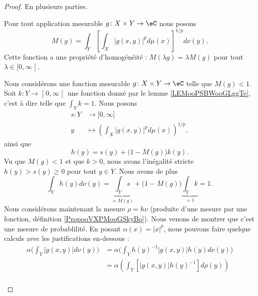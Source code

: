 \begin{proof}
	En plusieurs parties.
	\begin{subproof}
		\item[La fonction $M$]
		Pour tout application mesurable \( g\colon X\times Y\to \eC\) nous posons
		\begin{equation}
			M(g)=\int_Y \left[ \int_X| g(x,y) |^pd\mu(x) \right]^{1/p}d\nu(y).
		\end{equation}
		Cette fonction a une propriété d'homogénéité : \( M(\lambda g)=\lambda M(g)\) pour tout \( \lambda\in \mathopen[ 0 , \infty \mathclose[\).
			\item[Si $ M(g)<1 $]
			Nous considérons une fonction mesurable \( g\colon X\times Y\to \eC\) telle que \( M(g)<1\). Soit \( k\colon Y\to \mathopen] 0 , \infty \mathclose[\) une fonction donné par le lemme \ref{LEMooPSBWooGLggTe}, c'est à dire telle que \( \int_Yk=1\). Nous posons
		\begin{equation}
			\begin{aligned}
				s\colon Y & \to \mathopen[ 0 , \infty \mathclose]                   \\
				y         & \mapsto \left( \int_X| g(x,y) |^pd\mu(x) \right)^{1/p},
			\end{aligned}
		\end{equation}
		ainsi que
		\begin{equation}
			h(y)=s(y)+\big(1-M(g)\big)k(y).
		\end{equation}
		Vu que \( M(g)<1\) et que \( k>0\), nous avons l'inégalité stricte \( h(y)>s(y)\geq 0\) pour tout \( y\in Y\). Nous avons de plus
		\begin{equation}
			\int_Y h(y)d\nu(y)=\underbrace{\int_Ys}_{=M(g)}+\big( 1-M(g) \big)\underbrace{\int_Yk}_{=1}=1.
		\end{equation}
		Nous considérons maintenant la mesure \( \rho=h\nu\) (produite d'une mesure par une fonction, définition \ref{PropooVXPMooGSkyBo}). Nous venons de montrer que c'est une mesure de probablilité. En posant \( \alpha(x)=| x |^p\), nous pouvons faire quelque calculs avec les justifications en-dessous :
		\begin{subequations}        \label{SUBEQSooPPZIooSEDcpS}
			\begin{align}
				\alpha\big( \int_Y|g(x,y)|d\nu(y)\big) & =\alpha\big( \int_Yh(y)^{-1}|g(x,y)|h(y)d\nu(y)\big)                                     \\
				                                       & =\alpha\left( \int_Y [|g(x,y)|h(y)^{-1}]d\rho(y) \right)                                 \\

\end{align}
\end{subequations}
\end{subproof}
\end{proof}
